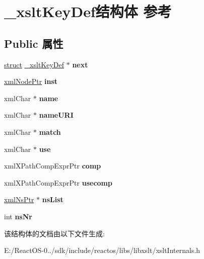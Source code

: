 \hypertarget{struct__xslt_key_def}{}\section{\+\_\+xslt\+Key\+Def结构体 参考}
\label{struct__xslt_key_def}
\subsection*{Public 属性}
\begin{DoxyCompactItemize}
\item 
\mbox{\label{struct__xslt_key_def_a32f47b257c872c0b7635d49a46abeed5}} 
\hyperlink{interfacestruct}{struct} \hyperlink{struct__xslt_key_def}{\+\_\+xslt\+Key\+Def} $\ast$ {\bfseries next}
\item 
\mbox{\label{struct__xslt_key_def_ae991afbc50f4e4c40749125e6cc9cd11}} 
\hyperlink{struct__xml_node}{xml\+Node\+Ptr} {\bfseries inst}
\item 
\mbox{\label{struct__xslt_key_def_ac8a4a16a68f07e45e9de91c747279069}} 
xml\+Char $\ast$ {\bfseries name}
\item 
\mbox{\label{struct__xslt_key_def_aae8cdeba4c8d9f54136f709f36ab1696}} 
xml\+Char $\ast$ {\bfseries name\+U\+RI}
\item 
\mbox{\label{struct__xslt_key_def_a22af1353b9563a19f27bc36c3125a02f}} 
xml\+Char $\ast$ {\bfseries match}
\item 
\mbox{\label{struct__xslt_key_def_a136f4ae4ccff767bb3f275e2a92f4a56}} 
xml\+Char $\ast$ {\bfseries use}
\item 
\mbox{\label{struct__xslt_key_def_a3e74439f6c8c99a0ff61cece03427f6c}} 
xml\+X\+Path\+Comp\+Expr\+Ptr {\bfseries comp}
\item 
\mbox{\label{struct__xslt_key_def_ab75a668f25e3a1d15844b2bad1f7e7ea}} 
xml\+X\+Path\+Comp\+Expr\+Ptr {\bfseries usecomp}
\item 
\mbox{\label{struct__xslt_key_def_a0d8487bdf541d42f90c3f5dc58c6913b}} 
\hyperlink{struct__xml_ns}{xml\+Ns\+Ptr} $\ast$ {\bfseries ns\+List}
\item 
\mbox{\label{struct__xslt_key_def_aa3d4f0e7ae8f05c9d6e7241bc3044c1b}} 
int {\bfseries ns\+Nr}
\end{DoxyCompactItemize}


该结构体的文档由以下文件生成\+:\begin{DoxyCompactItemize}
\item 
E\+:/\+React\+O\+S-\/0../sdk/include/reactos/libs/libxslt/xslt\+Internals.\+h\end{DoxyCompactItemize}
